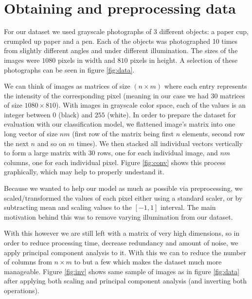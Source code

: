 \documentclass{article}
\newcommand{\enterProblemHeader}[1]{
}
\newcommand{\exitProblemHeader}[1]{
}
\newcounter{homeworkProblemCounter} %
\newcommand{\homeworkProblemName}{}
\newenvironment{homeworkProblem}[1][Problem \arabic{homeworkProblemCounter}]{ %
\stepcounter{homeworkProblemCounter} %
\renewcommand{\homeworkProblemName}{#1} %
\section{\homeworkProblemName} %
\enterProblemHeader{\homeworkProblemName} %
}{
\exitProblemHeader{\homeworkProblemName} %
}
\begin{document}
\begin{homeworkProblem}[Obtaining and preprocessing data]
For our dataset we used grayscale photographs of 3 different objects: a paper cup, crumpled up paper and a pen. Each of the objects was photographed 10 times from slightly different angles and under different illumination. The sizes of the images were $1080$ pixels in width and $810$ pixels in height. A selection of these photographs can be seen in figure \ref{fig:data}.

We can think of images as matrices of size $(n \times m)$ where each entry represents the intensity of the corresponding pixel (meaning in our case we had $30$ matrices of size $1080 \times 810$). With images in grayscale color space, each of the values is an integer between $0$ (black) and $255$ (white). In order to prepare the dataset for evaluation with our classification model, we flattened image's matrix into one long vector of size $n m$ (first row of the matrix being first $n$ elements, second row the next $n$ and so on $m$ times). We then stacked all individual vectors vertically to form a large matrix with $30$ rows, one for each individual image, and $n m$ columns, one for each individual pixel. Figure \ref{fig:conv} shows this process graphically, which may help to properly undestand it.

  Because we wanted to help our model as much as possible via preprocessing, we scaled/transformed the values of each pixel either using a standard scaler, or by subtracting mean and scaling values to the $[-1, 1]$ interval. The main motivation behind this was to remove varying illumination from our dataset.

  With this however we are still left with a matrix of very high dimensions, so in order to reduce processing time, decrease redundancy and amount of noise, we apply principal component analysis to it. With this we can to reduce the number of columns from $n \times m$ to but a few which makes the dataset much more manageable. Figure \ref{fig:inv} shows same sample of images as in figure \ref{fig:data} after applying both scaling and principal component analysis (and inverting both operations).
\end{homeworkProblem}

\end{document}
